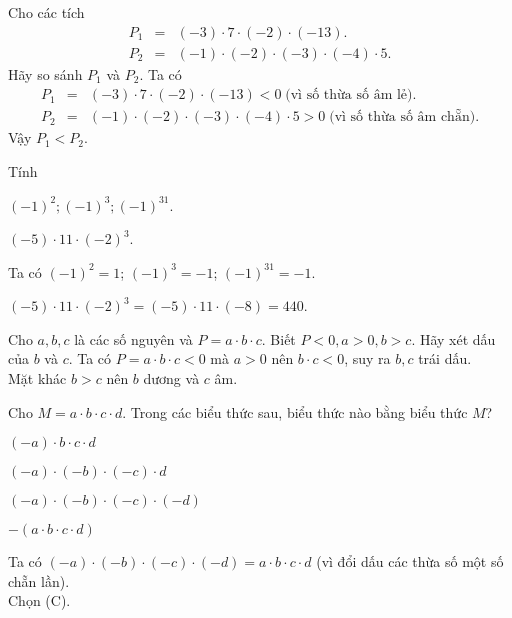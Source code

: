 \begin{vd}%
Cho các tích
\begin{eqnarray*}
P_1&=&(-3) \cdot 7 \cdot (-2) \cdot (-13).\\
P_2&=&(-1) \cdot (-2) \cdot (-3) \cdot (-4) \cdot 5.
\end{eqnarray*}
Hãy so sánh $ P_1 $	và $ P_2 $.
	\loigiai
	{
Ta có
\begin{eqnarray*}
	P_1&=&(-3) \cdot 7 \cdot (-2) \cdot (-13)<0 \;\text{(vì số thừa số âm lẻ)}.\\
	P_2&=&(-1) \cdot (-2) \cdot (-3) \cdot (-4) \cdot 5 >0 \;\text{(vì số thừa số âm chẵn)}.
\end{eqnarray*}	
Vậy $ P_1<P_2 $.	
	}
\end{vd}

\begin{vd}%
Tính
\begin{enumEX}{2}
	\item $ (-1)^2; (-1)^3; (-1)^{31} $.
	\item $ (-5) \cdot 11 \cdot (-2)^3 $.
\end{enumEX}	
	\loigiai
	{
\begin{enumEX}{1}
	\item Ta có $ (-1)^2=1 $; \qquad $ (-1)^3=-1 $; \qquad $ (-1)^{31}=-1 $.
	\item $ (-5) \cdot 11 \cdot (-2)^3=(-5) \cdot 11 \cdot (-8)=440 $.
\end{enumEX}	
	}
\end{vd}

\begin{vd}%
Cho $ a, b, c $ là các số nguyên và $ P=a \cdot b \cdot c $. Biết $ P<0, a>0, b>c $. Hãy xét dấu của $ b $ và $ c $.	
	\loigiai
	{
Ta có $ P=a \cdot b \cdot c <0 $ mà $ a>0 $ nên $ b \cdot c<0 $, suy ra $ b, c $ trái dấu.\\
Mặt khác $ b>c $ nên $ b $ dương và $ c $ âm.	
	}
\end{vd}

\begin{vd}%
Cho $ M=a \cdot b \cdot c \cdot d $. Trong các biểu thức sau, biểu thức nào bằng biểu thức $ M $?
\begin{enumEX}[(A)]{1}
	\item $ (-a) \cdot b \cdot c \cdot d $
	\item $ (-a) \cdot (-b) \cdot (-c) \cdot d $ 
	\item $ (-a) \cdot (-b) \cdot (-c) \cdot (-d) $ 
	\item $ -(a \cdot b \cdot c \cdot d) $
\end{enumEX}	
	\loigiai
	{
Ta có 	$ (-a) \cdot (-b) \cdot (-c) \cdot (-d) = a \cdot b \cdot c \cdot d$ (vì đổi dấu các thừa số một số chẵn lần).\\
Chọn (C).	
	}
\end{vd}

